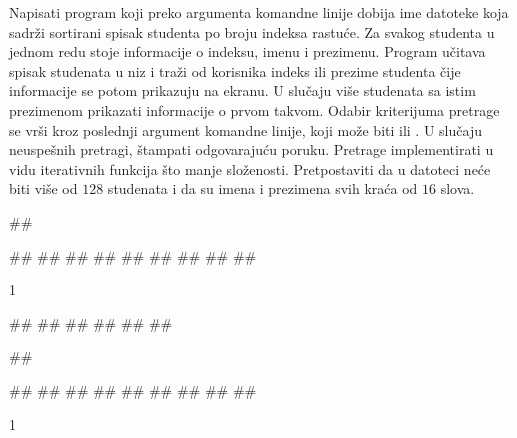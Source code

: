 \begin{Answer}[ref=402]
\end{Answer}
\begin{Exercise}[label=403]
  Napisati program koji preko argumenta komandne linije dobija ime
  datoteke koja sadrži sortirani spisak studenta po broju indeksa
  rastuće. Za svakog studenta u jednom redu stoje informacije o
  indeksu, imenu i prezimenu. Program učitava spisak studenata u niz i
  traži od korisnika indeks ili prezime studenta čije informacije se
  potom prikazuju na ekranu. U slučaju više studenata sa istim
  prezimenom prikazati informacije o prvom takvom. Odabir kriterijuma
  pretrage se vrši kroz poslednji argument komandne linije, koji može
  biti  ili . U slučaju neuspešnih
  pretragi, štampati odgovarajuću poruku. Pretrage implementirati u
  vidu iterativnih funkcija što manje složenosti. Pretpostaviti da u
  datoteci neće biti više od $128$ studenata i da su imena i prezimena
  svih kraća od $16$ slova.
  
\begin{miditest}
\begin{upotreba}{1}
##
  
##
##
##
##
##
##
##
##
##
\end{upotreba}
\end{miditest}
\begin{miditest}
\begin{test2}{1}
  
  
#\naslovInt#
## 
##
##
## 
##
\end{test2}
\end{miditest}

\begin{miditest}
\begin{upotreba}{2}
##
  
##
##
##
##
##
##
##
##
##
\end{upotreba}
\end{miditest}
\begin{miditest}
\begin{test2}{1}
  

\end{test2}
\end{miditest}
\end{Exercise}
